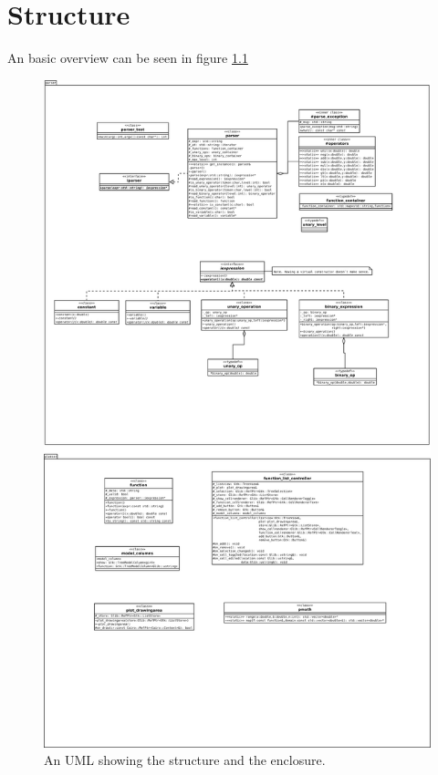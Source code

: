 \documentclass[a4paper,11pt]{kth-mag}
\begin{document}
\chapter{Structure}
An basic overview can be seen in figure \ref{fig:UML}
\begin{figure}[ht]
\begin{center}
    \includegraphics[width=\textwidth]{uml.pdf}
    \caption{\small{An UML showing the structure and the enclosure.}}\label{fig:UML}
\end{center}
\end{figure}
\end{document}
